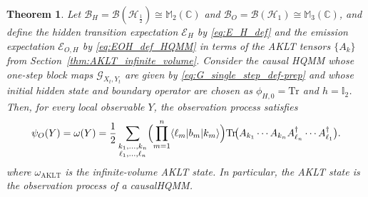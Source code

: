 \documentclass[11pt,a4paper]{article}
\newtheorem{theorem}{Theorem}[section]
\def\Tr{\mathrm{Tr}}
\begin{document}
\begin{theorem}\label{thm:AKLT_is_observation_rigorous}
Let \(\mathcal{B}_H=\mathcal{B}(\mathcal{H}_{\frac{1}{2}})\cong\mathbb{M}_2(\mathbb{C})\) and \(\mathcal{B}_O=\mathcal{B}(\mathcal{H}_{1})\cong\mathbb{M}_3(\mathbb{C})\), and define the hidden transition expectation \(\mathcal{E}_H\) by \eqref{eq:E_H_def} and the emission expectation \(\mathcal{E}_{O,H}\) by \eqref{eq:EOH_def_HQMM} in terms of the AKLT tensors \(\{A_k\}\) from Section~\ref{thm:AKLT_infinite_volume}. Consider the causal HQMM whose one-step block maps \(\mathcal{G}_{X_t,Y_t}\) are given by \eqref{eq:G_single_step_def-prep} and whose initial hidden state and boundary operator are chosen as \(\phi_{H,0}=\Tr\) and \(h=\mathbb{I}_2\). Then, for every local observable \(Y\), the observation process satisfies
\begin{equation}\label{eq:omega_AKLT_MPS_factorized}
\psi_{O}(Y)=\omega(Y)
=
\frac{1}{2}\sum_{\substack{k_1,\dots,k_n\\ \ell_1,\dots,\ell_n}}
\Bigl(\prod_{m=1}^{n}\langle \ell_m|b_m|k_m\rangle\Bigr)
\Tr\!\bigl(
 A_{k_1}\cdots A_{k_n}A_{\ell_n}^{\dagger}\cdots A_{\ell_1}^{\dagger}
\bigr).
\end{equation}
where \(\omega_{\mathrm{AKLT}}\) is the infinite-volume AKLT state. In particular, the AKLT state is the observation process of a causalHQMM.
\end{theorem}
\end{document}
